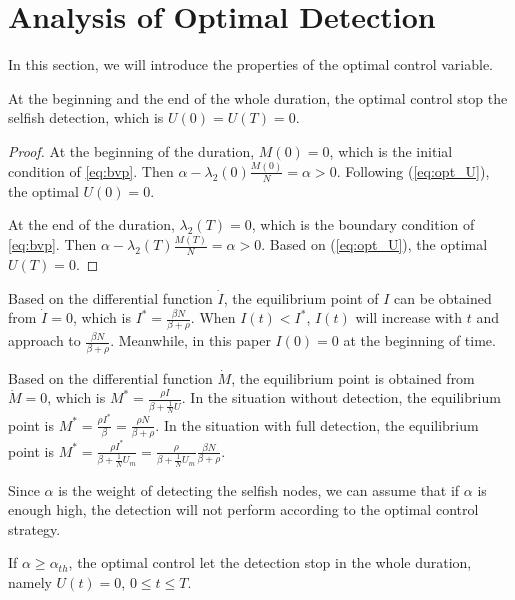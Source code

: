 \section{Analysis of Optimal Detection}
\label{sec:ana_opt_detect}
In this section, we will introduce the properties of the optimal control variable.

\begin{lem}At the beginning and the end of the whole duration,
the optimal control stop the selfish detection,
which is $U(0)=U(T)=0$.
\end{lem}

\begin{proof}
At the beginning of the duration, $M(0)=0$,
which is the initial condition of \ref{eq:bvp}.
Then $\alpha - \lambda_{2}(0) \frac{M(0)}{N} = \alpha > 0$.
Following (\ref{eq:opt_U}), the optimal $U(0)=0$.

At the end of the duration, $\lambda_{2}(T)=0$,
which is the boundary condition of \ref{eq:bvp}.
Then $\alpha - \lambda_{2}(T) \frac{M(T)}{N} = \alpha > 0$.
Based on (\ref{eq:opt_U}), the optimal $U(T)=0$.
\end{proof}

Based on the differential function $\dot{I}$,
the equilibrium point of $I$ can be obtained from $\dot{I}=0$,
which is $I^{*}=\frac{\beta N}{\beta+\rho}$.
When $I(t)<I^{*}$, $I(t)$ will increase with $t$ and approach to $\frac{\beta N}{\beta+\rho}$.
Meanwhile, in this paper $I(0)=0$ at the beginning of time.

Based on the differential function $\dot{M}$,
the equilibrium point is obtained from $\dot{M}=0$,
which is $M^{*}=\frac{\rho I}{\beta+\frac{1}{N}U}$.
In the situation without detection,
the equilibrium point is $M^{*}=\frac{\rho I^{*}}{\beta}=\frac{\rho N}{\beta + \rho}$.
In the situation with full detection,
the equilibrium point is $M^{*}=\frac{\rho I^{*}}{\beta + \frac{1}{N} U_{m}}=\frac{\rho}{\beta + \frac{1}{N} U_{m}} \frac{\beta N}{\beta+\rho}$.

Since $\alpha$ is the weight of detecting the selfish nodes,
we can assume that if $\alpha$ is enough high, the detection will not perform according to the optimal control strategy.
\begin{lem}
If $\alpha \ge \alpha_{th}$, the optimal control let the detection stop in the whole duration,
namely $U(t)=0$, $0 \le t \le T$.
\end{lem}

